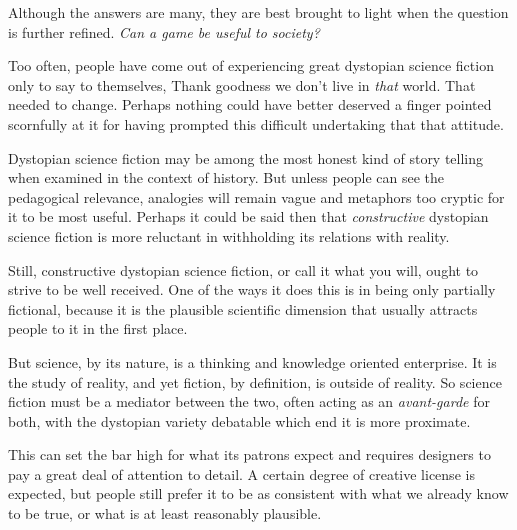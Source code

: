 

Although the answers are many, they are best brought to light when the question is further refined. {\it Can a game be useful to society?}

Too often, people have come out of experiencing great dystopian science fiction only to say to themselves, Thank goodness we don't live in {\it that} world. That needed to change. Perhaps nothing could have better deserved a finger pointed scornfully at it for having prompted this difficult undertaking that that attitude.

Dystopian science fiction may be among the most honest kind of story telling when examined in the context of history. But unless people can see the pedagogical relevance, analogies will remain vague and metaphors too cryptic for it to be most useful. Perhaps it could be said then that {\it constructive} dystopian science fiction is more reluctant in withholding its relations with reality.

    {}

Still, constructive dystopian science fiction, or call it what you will, ought to strive to be well received. One of the ways it does this is in being only partially fictional, because it is the plausible scientific dimension that usually attracts people to it in the first place.

But science, by its nature, is a thinking and knowledge oriented enterprise. It is the study of reality, and yet fiction, by definition, is outside of reality. So science fiction must be a mediator between the two, often acting as an {\it avant-garde} for both, with the dystopian variety debatable which end it is more proximate.

This can set the bar high for what its patrons expect and requires designers to pay a great deal of attention to detail. A certain degree of creative license is expected, but people still prefer it to be as consistent with what we already know to be true, or what is at least reasonably plausible.

